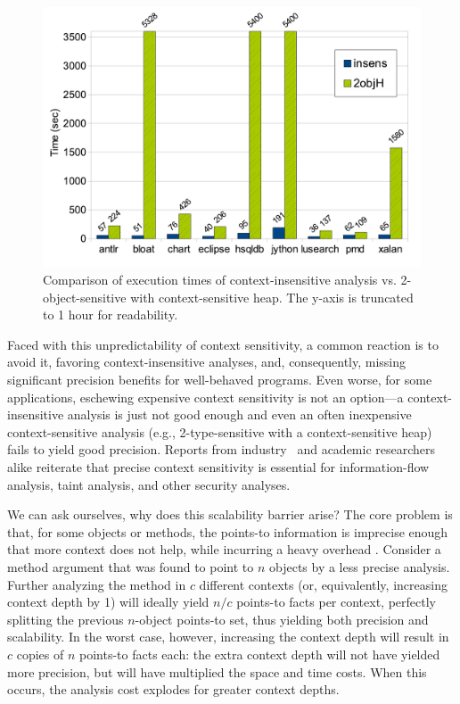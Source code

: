 \begin{figure}[hp]
\begin{center}
\hspace{-2mm}\includegraphics[scale=0.42]{assets/introspective/intro-chart.pdf}
\end{center}
\vspace{-0.6cm}
\caption[Execution times of context-insensitive vs. 2objH]{Comparison of execution times of context-insensitive analysis vs. 2-object-sensitive with context-sensitive heap. The y-axis is truncated to 1 hour for readability.}
\label{fig:introspect:intro}
\end{figure}

Faced with this unpredictability of context sensitivity, a common reaction is to avoid it, favoring context-insensitive analyses, and, consequently, missing significant precision benefits for well-behaved programs. Even worse, for some applications, eschewing expensive context sensitivity is not an option---a context-insensitive analysis is just not good enough and even an often inexpensive context-sensitive analysis (e.g., 2-type-sensitive with a context-sensitive heap) fails to yield good precision. Reports from industry~\cite{misc:Cifuentes} and academic researchers~\cite{misc:Chong} alike reiterate that precise context sensitivity is essential for information-flow analysis, taint analysis, and other security analyses.

We can ask ourselves, why does this scalability barrier arise? The core problem is that, for some objects or methods, the points-to information is imprecise enough that more context does not help, while incurring a heavy overhead \cite{popl:2011:Smaragdakis}. Consider a method argument that was found to point to $n$ objects by a less precise analysis. Further analyzing the method in $c$ different contexts (or, equivalently, increasing context depth by 1) will ideally yield $n/c$ points-to facts per context, perfectly splitting the previous $n$-object points-to set, thus yielding both precision and scalability. In the worst case, however, increasing the context depth will result in $c$ copies of $n$ points-to facts each: the extra context depth will not have yielded more precision, but will have multiplied the space and time costs. When this occurs, the analysis cost explodes for greater context depths.

